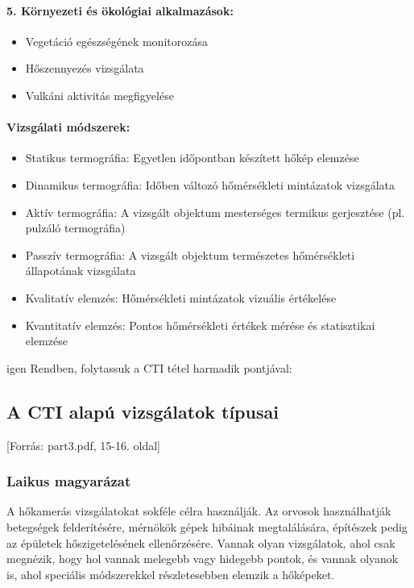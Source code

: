 \documentclass[a4paper,12pt]{article}
\begin{document}
\paragraph{5. Környezeti és ökológiai alkalmazások:} \begin{itemize} \item Vegetáció egészségének monitorozása \item Hőszennyezés vizsgálata \item Vulkáni aktivitás megfigyelése \end{itemize}

\paragraph{Vizsgálati módszerek:} \begin{itemize} \item Statikus termográfia: Egyetlen időpontban készített hőkép elemzése \item Dinamikus termográfia: Időben változó hőmérsékleti mintázatok vizsgálata \item Aktív termográfia: A vizsgált objektum mesterséges termikus gerjesztése (pl. pulzáló termográfia) \item Passzív termográfia: A vizsgált objektum természetes hőmérsékleti állapotának vizsgálata \item Kvalitatív elemzés: Hőmérsékleti mintázatok vizuális értékelése \item Kvantitatív elemzés: Pontos hőmérsékleti értékek mérése és statisztikai elemzése \end{itemize}

igen
Rendben, folytassuk a CTI tétel harmadik pontjával:

\subsection{A CTI alapú vizsgálatok típusai} [Forrás: part3.pdf, 15-16. oldal]

\subsubsection{Laikus magyarázat} A hőkamerás vizsgálatokat sokféle célra használják. Az orvosok használhatják betegségek felderítésére, mérnökök gépek hibáinak megtalálására, építészek pedig az épületek hőszigetelésének ellenőrzésére. Vannak olyan vizsgálatok, ahol csak megnézik, hogy hol vannak melegebb vagy hidegebb pontok, és vannak olyanok is, ahol speciális módszerekkel részletesebben elemzik a hőképeket.
\end{document}
